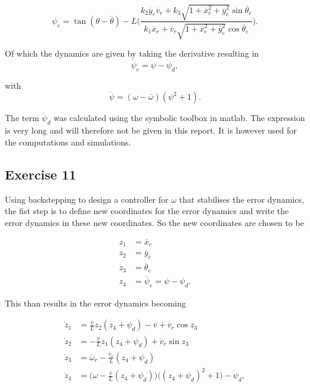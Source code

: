 \begin{equation}
    \psi_e = \tan(\theta-\overline{\theta}) - L \Big( \frac{k_2\overline{y}_e\overline{v}_r + k_3 \sqrt{1+\overline{x}_e^2+\overline{y}_e^2}\sin\overline{\theta}_e}{k_1\overline{x}_e + \overline{v}_r\sqrt{1+\overline{x}_e^2+\overline{y}_e^2}\cos\overline{\theta}_e} \Big). \label{eq:ex10_psi_e}
\end{equation}

Of which the dynamics are given by taking the derivative resulting in
\begin{equation}
    \dot{\psi}_e = \dot{\psi} - \dot{\psi}_d, \label{eq:ex10_psiedot}
\end{equation}

with
\begin{equation}
    \dot{\psi} = (\omega - \overline{\omega})(\psi^2 + 1). \label{eq:ex10_psidot}
\end{equation}

The term $\dot{\psi}_d$ was calculated using the symbolic toolbox in matlab. The expression is very long and will therefore not be given in this report. It is however used for the computations and simulations.
\subsection{Exercise 11}
Using backstepping to design a controller for $\omega$ that stabilises the error dynamics, the fist step is to define new coordinates for the error dynamics and write the error dynamics in these new coordinates. So the new coordinates are chosen to be

\begin{align}
    z_1 &= \overline{x}_e \label{eq:ex11_newcoordsz_1} \\
    z_2 &= \overline{y}_e \label{eq:ex11_newcoordsz_2} \\
    z_3 &= \overline{\theta}_e \label{eq:ex11_newcoordsz_3} \\
    z_4 &= \overline{\psi}_e  = \psi - \psi_d \label{eq:ex11_newcoordsz_4}.
\end{align}

This than results in the error dynamics becoming

\begin{align}
    \dot{z}_1 &= \frac{\overline{v}}{L}z_2(z_4+\psi_d) - \overline{v} + \overline{v}_r\cos z_3 \label{eq:ex11_dynz_1} \\
    \dot{z}_2 &= -\frac{\overline{v}}{L}z_1(z_4+\psi_d) + \overline{v}_r\sin z_3 \label{eq:ex11_dynz_2}\\
    \dot{z}_3 &= \overline{\omega}_r - \frac{\overline{v}_r}{L}(z_4+\psi_d) \label{eq:ex11_dynz_3} \\
    \dot{z}_4 &= \Big(\omega - \frac{\overline{v}}{L}(z_4+\psi_d)\Big)\Big((z_4+\psi_d)^2+1\Big)-\dot{\psi}_d \label{eq:ex11_dynz_4},
\end{align}

